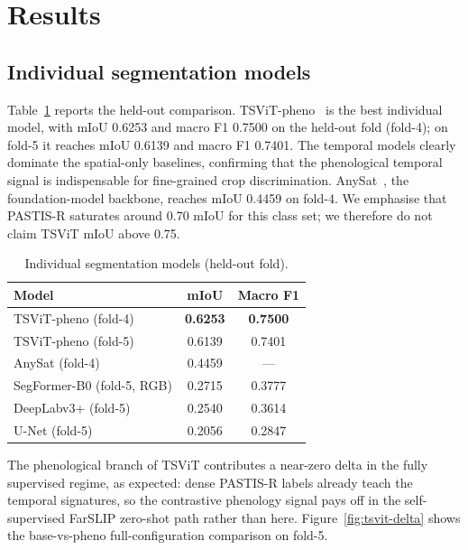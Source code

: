 \section{Results}
\label{sec:results}

\subsection{Individual segmentation models}
\label{sec:results-individual}
Table~\ref{tab:individual} reports the held-out comparison.
TSViT-pheno~\cite{tarasiou2023tsvit} is the best individual model, with
mIoU 0.6253 and macro F1 0.7500 on the held-out fold (fold-4); on
fold-5 it reaches mIoU 0.6139 and macro F1 0.7401. The temporal models
clearly dominate the spatial-only baselines, confirming that the
phenological temporal signal is indispensable for fine-grained crop
discrimination. AnySat~\cite{astruc2024anysat}, the foundation-model
backbone, reaches mIoU 0.4459 on fold-4. We emphasise that PASTIS-R
saturates around 0.70 mIoU for this class set; we therefore do not
claim TSViT mIoU above 0.75.

\begin{table}[htbp]
\caption{Individual segmentation models (held-out fold).}
\label{tab:individual}
\centering
\begin{tabular}{lcc}
\toprule
\textbf{Model} & \textbf{mIoU} & \textbf{Macro F1} \\
\midrule
TSViT-pheno (fold-4) & \textbf{0.6253} & \textbf{0.7500} \\
TSViT-pheno (fold-5) & 0.6139 & 0.7401 \\
AnySat (fold-4)      & 0.4459 & --- \\
SegFormer-B0 (fold-5, RGB) & 0.2715 & 0.3777 \\
DeepLabv3+ (fold-5)  & 0.2540 & 0.3614 \\
U-Net (fold-5)       & 0.2056 & 0.2847 \\
\bottomrule
\end{tabular}
\end{table}

The phenological branch of TSViT contributes a near-zero delta in the
fully supervised regime, as expected: dense PASTIS-R labels already
teach the temporal signatures, so the contrastive phenology signal pays
off in the self-supervised FarSLIP zero-shot path rather than here.
Figure~\ref{fig:tsvit-delta} shows the base-vs-pheno full-configuration
comparison on fold-5.

